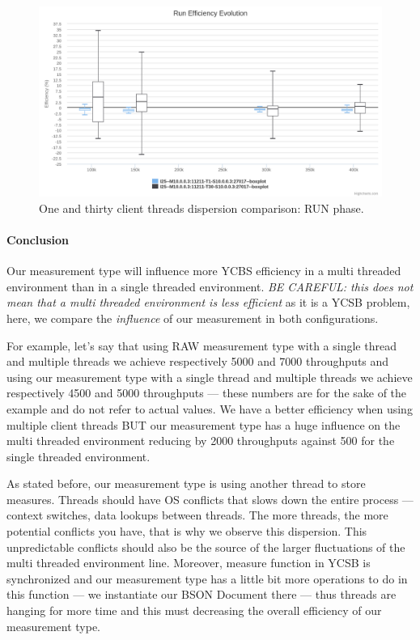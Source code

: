 \documentclass[a4paper,11pt]{report}
\begin{document}
\begin{figure}[ht]
\begin{center}
\includegraphics[width=1\linewidth]{images/evaluation/thread30-SMremote-run.png}
\caption{One and thirty client threads dispersion comparison: RUN phase.}
\label{thread30-SMremote-run}
\end{center}
\end{figure}

\paragraph{Conclusion} Our measurement type will influence more YCBS efficiency in a multi threaded environment than in a single threaded environment. \textit{BE CAREFUL: this does not mean that a multi threaded environment is less efficient} as it is a YCSB problem, here, we compare the \textit{influence} of our measurement in both configurations. 

For example, let's say that using RAW measurement type with a single thread and multiple threads  we achieve respectively 5000 and 7000 throughputs and using our measurement type with a single thread and multiple threads we achieve respectively 4500 and 5000 throughputs --- these numbers are for the sake of the example and do not refer to actual values. We have a better efficiency when using multiple client threads BUT our measurement type has a huge influence on the multi threaded environment reducing by 2000 throughputs against 500 for the single threaded environment.

As stated before, our measurement type is using another thread to store measures. Threads should have OS conflicts that slows down the entire process --- context switches, data lookups between threads. The more threads, the more potential conflicts you have, that is why we observe this dispersion. This unpredictable conflicts should also be the source of the larger fluctuations of the multi threaded environment line.
Moreover, measure function in YCSB is synchronized and our measurement type has a little bit more operations to do in this function --- we instantiate our BSON Document there --- thus threads are hanging for more time and this must decreasing the overall efficiency of our measurement type.
\end{document}
